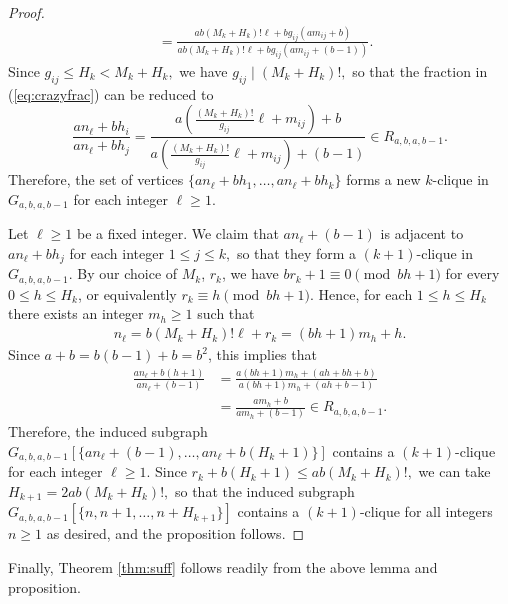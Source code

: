 \documentclass[12pt, reqno, a4paper]{amsart}
\theoremstyle{definition}
\theoremstyle{remark}
\numberwithin{equation}{section}
\renewcommand{\leq}{\leqslant}
\renewcommand{\geq}{\geqslant}
\begin{document}
\begin{proof}
\begin{align}
&=  \frac{a  b (M_k+H_k)! {\ell}+bg_{ij}(am_{ij}+b)}{a  b (M_k+H_k)! {\ell}+bg_{ij} (am_{ij}+(b-1))}.  \label{eq:crazyfrac}
\end{align}
Since $g_{ij} \leq H_k < M_k+H_k,$ we have $g_{ij} \mid (M_k+H_k)!,$ so that the fraction in (\ref{eq:crazyfrac}) can be reduced to
\begin{equation*}
\frac{an_{\ell}+bh_i}{an_{\ell}+bh_j} = \frac{a \left( \frac{(M_k+H_k)!}{g_{ij}}{\ell}+m_{ij} \right)+b}{a \left( \frac{(M_k+H_k)!}{g_{ij}}{\ell}+m_{ij} \right)+(b-1)} \in R_{a,b,a,b-1}.
\end{equation*}
Therefore, the set of vertices $\{ an_{\ell}+bh_1, \ldots, an_{\ell}+bh_k \}$ forms a new $k$-clique in $G_{a,b,a,b-1}$ for each integer ${\ell} \geq 1$. 

Let ${\ell} \geq 1$ be a fixed integer. We claim that $an_{\ell}+(b-1)$ is adjacent to $an_{\ell}+bh_j$ for each integer $1 \leq j \leq k,$ so that they form a $(k+1)$-clique in $G_{a,b,a,b-1}.$ By our choice of $M_k$, $r_k$, we have $br_k+1\equiv 0 \pmod{bh+1}$ for every $0\leq h\leq H_k$, or equivalently $r_k\equiv h\pmod{bh+1}$. Hence, for each $1\leq h\leq H_k$ there exists an integer $m_h \geq 1$ such that 
\begin{align*}
n_{\ell} = b(M_k+H_k)! {\ell} +r_k = (bh+1)m_h +h.
\end{align*}
Since $a+b = b(b-1)+b = b^2$, this implies that
\begin{align}
\frac{an_{\ell}+b(h+1)}{an_{\ell}+(b-1)} &= \frac{a(bh+1)m_h+ (ah+bh+b)}{a(bh+1)m_h+(ah+b-1)} \nonumber \\
&= \frac{am_h+b}{am_h+(b-1)} \in R_{a,b,a,b-1}. \label{eq:red2}
\end{align}
Therefore, the induced subgraph $G_{a,b,a,b-1}[\{an_{\ell}+(b-1), \ldots, an_{\ell}+b(H_k+1) \}]$ contains a $(k+1)$-clique for each integer ${\ell} \geq 1$. Since $r_k+b(H_k+1) \leq ab(M_k+H_k)!, $ we can take $H_{k+1}=2ab(M_k+H_k)!,$ so that
 the induced subgraph $G_{a,b,a,b-1}[\{n, n+1, \ldots, n+H_{k+1}\}]$ contains a $(k+1)$-clique for all integers $n \geq 1$ as desired, and the proposition follows.
\end{proof}

Finally, Theorem \ref{thm:suff} follows readily from the above lemma and proposition.
\end{document}
